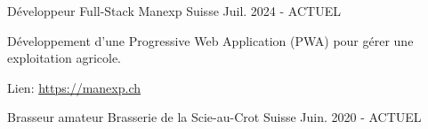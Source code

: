 

\begin{cventries}

    \cventry
    {Développeur Full-Stack} %
    {Manexp} %
    {Suisse} %
    {Juil. 2024 - ACTUEL} %
    {
      \begin{cvitems} %
        \item {Développement d'une Progressive Web Application (PWA) pour gérer une exploitation agricole.}
        \item {Lien: \href{https://manexp.ch}{https://manexp.ch}}
      \end{cvitems}
    }

    \cventry
    {Brasseur amateur} %
    {Brasserie de la Scie-au-Crot} %
    {Suisse} %
    {Juin. 2020 - ACTUEL} %
    {}

\end{cventries}
